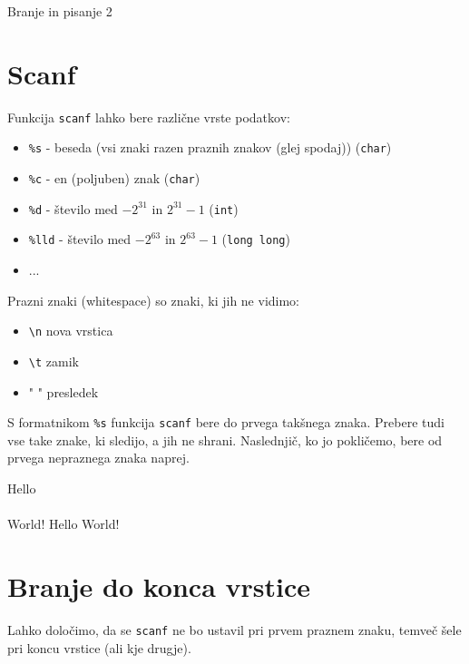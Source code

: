 
Branje in pisanje 2

\section{Scanf}

Funkcija \verb+scanf+ lahko bere različne vrste podatkov:
\begin{itemize}
	\item \verb+%s+ - beseda (vsi znaki razen praznih znakov (glej spodaj)) (\verb+char+)
	\item \verb+%c+ - en (poljuben) znak (\verb+char+)
	\item \verb+%d+ - število med $-2^{31}$ in $2^{31}-1$ (\verb+int+)
	\item \verb+%lld+ - število med $-2^{63}$ in $2^{63}-1$ (\verb+long long+)
	\item ...
\end{itemize}

\noindent Prazni znaki (whitespace) so znaki, ki jih ne vidimo:
\begin{itemize}
	\item \verb+\n+ nova vrstica
	\item \verb+\t+ zamik
	\item " " presledek
\end{itemize}

S formatnikom \verb+%s+ funkcija \verb+scanf+ bere do prvega takšnega znaka. Prebere tudi vse take znake, ki sledijo, a jih ne shrani. Naslednjič, ko jo pokličemo, bere od prvega nepraznega znaka naprej.

\begin{examples}


\begin{inout}
Hello \\ \\ World!
\tcblower
Hello World!
\end{inout}


\end{examples}

\pagebreak
\section{Branje do konca vrstice}

Lahko določimo, da se \verb+scanf+ ne bo ustavil pri prvem praznem znaku, temveč šele pri koncu vrstice (ali kje drugje).

